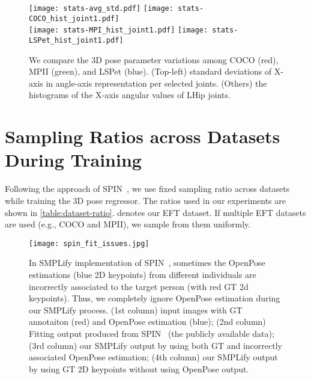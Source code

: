 \documentclass[10pt,twocolumn,letterpaper]{article}
\begin{document}
	\begin{figure}[t]
		\vspace{-20pt} 
		\centering
		\texttt{[image: stats-avg\_std.pdf]}
		\texttt{[image: stats-COCO\_hist\_joint1.pdf]}\\
		\texttt{[image: stats-MPI\_hist\_joint1.pdf]}
		\texttt{[image: stats-LSPet\_hist\_joint1.pdf]}
\caption{We compare the 3D pose parameter variations among COCO (red), MPII (green), and LSPet (blue). (Top-left) standard deviations of X-axis in angle-axis representation per selected joints. (Others) the histograms of the X-axis angular values of LHip joints.
			\label{fig:stats_dbs}
		}
	\end{figure}
	
	\section{Sampling Ratios across Datasets During Training}
	
	Following the approach of SPIN~\cite{kolotouros2019spin}, we use fixed sampling ratio across datasets while training the 3D pose regressor. The ratios used in our experiments are shown in \cref{table:dataset-ratio}.  denotes our EFT dataset. If multiple EFT datasets are used (e.g., COCO and MPII), we sample from them uniformly.
	
	
	
	\begin{figure}[t]
		\centering
		\texttt{[image: spin\_fit\_issues.jpg]}
		\caption{In SMPLify implementation of SPIN~\cite{kolotouros2019spin}, sometimes the OpenPose estimations (blue 2D keypoints) from different individuals are incorrectly associated to the target person (with red GT 2d keypoints). Thus, we completely ignore OpenPose estimation during our SMPLify process. (1st column) input images with GT annotaiton (red) and OpenPose estimation (blue); (2nd column) Fitting output produced from SPIN~\cite{kolotouros2019spin} (the publicly available data); (3rd column) our SMPLify output by using both GT and incorrectly associated OpenPose estimation; (4th column) our SMPLify output by using GT 2D keypoints without using OpenPose output. }\label{fig:spin_fit_issues}
	\end{figure}
	
	
\end{document}

